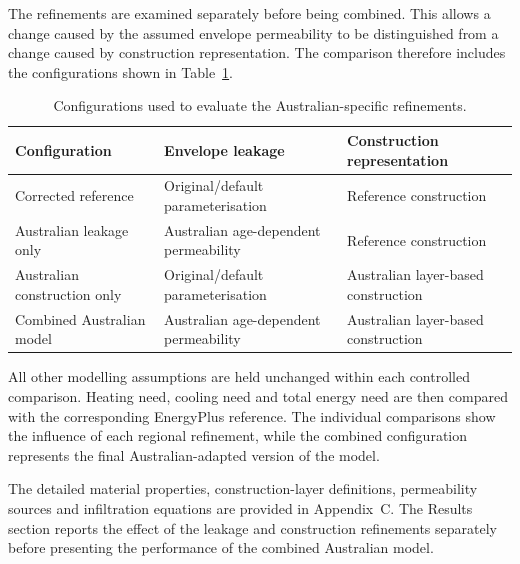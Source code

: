 \documentclass[12pt, a4paper]{article}
\begin{document}
The refinements are examined separately before being combined. This allows a
change caused by the assumed envelope permeability to be distinguished from a
change caused by construction representation. The comparison therefore
includes the configurations shown in Table~\ref{tab:AU_variants}.

\begin{table}[htbp]
\centering
\caption{Configurations used to evaluate the Australian-specific refinements.}
\label{tab:AU_variants}
\begin{tabular}{p{4.0cm}p{4.3cm}p{4.3cm}}
\toprule
\textbf{Configuration} &
\textbf{Envelope leakage} &
\textbf{Construction representation} \\
\midrule

Corrected reference &
Original/default parameterisation &
Reference construction \\

Australian leakage only &
Australian age-dependent permeability &
Reference construction \\

Australian construction only &
Original/default parameterisation &
Australian layer-based construction \\

Combined Australian model &
Australian age-dependent permeability &
Australian layer-based construction \\
\bottomrule
\end{tabular}
\end{table}

All other modelling assumptions are held unchanged within each controlled
comparison. Heating need, cooling need and total energy need are then compared
with the corresponding EnergyPlus reference. The individual comparisons show
the influence of each regional refinement, while the combined configuration
represents the final Australian-adapted version of the model.

The detailed material properties, construction-layer definitions, permeability
sources and infiltration equations are provided in Appendix~C. The Results
section reports the effect of the leakage and construction refinements
separately before presenting the performance of the combined Australian model.
\end{document}
